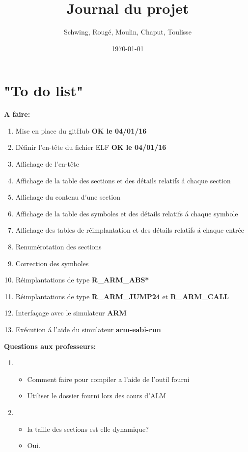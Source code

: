 \documentclass[12pt, a4paper]{article}
\title{Journal du projet}
\author{Schwing, Roug\'e, Moulin, Chaput, Toulisse}
\date{\today}
\begin{document}
\maketitle

\section{"To do list"}
\textbf{A faire:}
\begin{enumerate}
\item Mise en place du gitHub \textbf{OK le 04/01/16} 
\item Définir l'en-t\^ete du fichier ELF \textbf{OK le 04/01/16}
\item Affichage de l'en-t\^ete
\item Affichage de la table des sections et des détails 
	relatifs \'a chaque section
\item Affichage du contenu d'une section
\item Affichage de la table des symboles et des détails relatifs 
	\'a chaque symbole
\item Affichage des tables de réimplantation et des détails relatifs 
	\'a chaque entrée 
\item Renumérotation des sections
\item Correction des symboles
\item Réimplantations de type \textbf{R\_ARM\_ABS*}
\item Réimplantations de type \textbf{R\_ARM\_JUMP24} et 
	\textbf{R\_ARM\_CALL}
\item Interfaçage avec le simulateur \textbf{ARM}
\item Exécution \'a l'aide du simulateur \textbf{arm-eabi-run}
\end{enumerate}

\textbf{Questions aux professeurs:}
\begin{enumerate}
\item 
	\begin{itemize}
		\item Comment faire pour compiler a l'aide de l'outil fourni
		\item Utiliser le dossier fourni lors des cours d'ALM
	\end{itemize}
\item 
	\begin{itemize}
		\item la taille des sections est elle dynamique?
		\item Oui.
	\end{itemize}
\end{enumerate}
\end{document}
